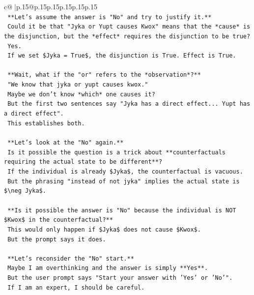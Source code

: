 \documentclass{article}
\begin{document}
{\begin{supertabular}{c@{$\;$}|p{.15\linewidth}@{}p{.15\linewidth}p{.15\linewidth}p{.15\linewidth}p{.15\linewidth}p{.15\linewidth}}
{{{\\ 
\texttt{    **Let's assume the answer is "No" and try to justify it.**} \\
\texttt{    Could it be that "Jyka or Yupt causes Kwox" means that the *cause* is the disjunction, but the *effect* requires the disjunction to be true?} \\
\texttt{    Yes.} \\
\texttt{    If we set \$Jyka = True\$, the disjunction is True. Effect is True.} \\
\\ 
\texttt{    **Wait, what if the "or" refers to the *observation*?**} \\
\texttt{    "We know that jyka or yupt causes kwox."} \\
\texttt{    Maybe we don't know *which* one causes it?} \\
\texttt{    But the first two sentences say "Jyka has a direct effect... Yupt has a direct effect".} \\
\texttt{    This establishes both.} \\
\\ 
\texttt{    **Let's look at the "No" again.**} \\
\texttt{    Is it possible the question is a trick about **counterfactuals requiring the actual state to be different**?} \\
\texttt{    If the individual is already \$Jyka\$, the counterfactual is vacuous.} \\
\texttt{    But the phrasing "instead of not jyka" implies the actual state is \$\textbackslash{}neg Jyka\$.} \\
\\ 
\texttt{    **Is it possible the answer is "No" because the individual is NOT \$Kwox\$ in the counterfactual?**} \\
\texttt{    This would only happen if \$Jyka\$ does not cause \$Kwox\$.} \\
\texttt{    But the prompt says it does.} \\
\\ 
\texttt{    **Let's reconsider the "No" start.**} \\
\texttt{    Maybe I am overthinking and the answer is simply **Yes**.} \\
\texttt{    But the user prompt says "Start your answer with 'Yes' or 'No'".} \\
\texttt{    If I am an expert, I should be careful.} \\
\\ 
}}}
\end{supertabular}}
\end{document}
